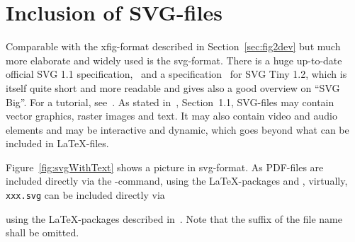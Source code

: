   
  
  



  







\section{Inclusion of SVG-files}\label{sec:picSvg}

Comparable with the xfig-format described in Section~\ref{sec:fig2dev} 
but much more elaborate and widely used is the \gls{svg}-format. 
There is a huge up-to-date official SVG 1.1 specification,~\cite{Svg11} 
and a specification~\cite{Svg12Tiny} for SVG Tiny 1.2, 
which is itself quite short and more readable 
and gives also a good overview on ``SVG Big''. 
For a tutorial, see~\cite{SvgTut}. 
As stated in~\cite{Svg12Tiny}, Section~1.1, 
SVG-files may contain vector graphics, raster images and text. 
It may also contain video and audio elements 
and may be interactive and dynamic, 
which goes beyond what can be included in \LaTeX-files. 

Figure~\ref{fig:svgWithText} shows a picture in \gls{svg}-format. 
As PDF-files are included directly 
via the -command, 
using the \LaTeX-packages  and , 
virtually, 
\texttt{xxx.svg} can be included directly via 
\begin{taglstlisting}[language=TeX]
\end{taglstlisting}
%
using the \LaTeX-packages  described in~\cite{SvgP}. 
Note that the suffix of the file name shall be omitted. 

